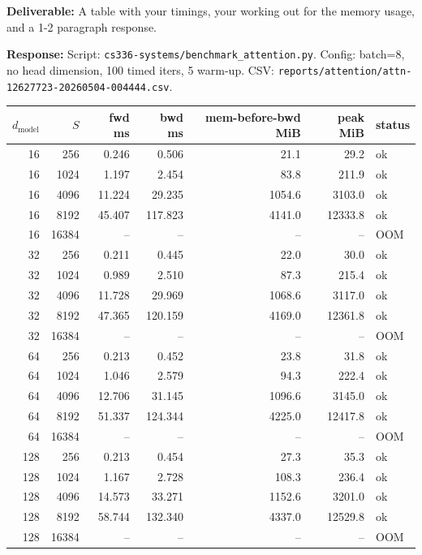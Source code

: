 \documentclass[11pt]{article}
\begin{document}
\textbf{Deliverable:} A table with your timings, your working out for the memory usage, and a 1-2 paragraph response.

\vspace{0.25cm}
\textbf{Response:}
Script: \texttt{cs336-systems/benchmark\_attention.py}. Config: batch=8, no head dimension, 100 timed iters, 5 warm-up. CSV: \verb|reports/attention/attn-12627723-20260504-004444.csv|.

\begin{table}[H]
\centering\small
\begin{tabular}{rrrrrrl}
\toprule
$d_\text{model}$ & $S$ & fwd ms & bwd ms & mem-before-bwd MiB & peak MiB & status \\
\midrule
16  & 256   & 0.246  & 0.506   & 21.1   & 29.2    & ok \\
16  & 1024  & 1.197  & 2.454   & 83.8   & 211.9   & ok \\
16  & 4096  & 11.224 & 29.235  & 1054.6 & 3103.0  & ok \\
16  & 8192  & 45.407 & 117.823 & 4141.0 & 12333.8 & ok \\
16  & 16384 & --     & --      & --     & --      & OOM \\
32  & 256   & 0.211  & 0.445   & 22.0   & 30.0    & ok \\
32  & 1024  & 0.989  & 2.510   & 87.3   & 215.4   & ok \\
32  & 4096  & 11.728 & 29.969  & 1068.6 & 3117.0  & ok \\
32  & 8192  & 47.365 & 120.159 & 4169.0 & 12361.8 & ok \\
32  & 16384 & --     & --      & --     & --      & OOM \\
64  & 256   & 0.213  & 0.452   & 23.8   & 31.8    & ok \\
64  & 1024  & 1.046  & 2.579   & 94.3   & 222.4   & ok \\
64  & 4096  & 12.706 & 31.145  & 1096.6 & 3145.0  & ok \\
64  & 8192  & 51.337 & 124.344 & 4225.0 & 12417.8 & ok \\
64  & 16384 & --     & --      & --     & --      & OOM \\
128 & 256   & 0.213  & 0.454   & 27.3   & 35.3    & ok \\
128 & 1024  & 1.167  & 2.728   & 108.3  & 236.4   & ok \\
128 & 4096  & 14.573 & 33.271  & 1152.6 & 3201.0  & ok \\
128 & 8192  & 58.744 & 132.340 & 4337.0 & 12529.8 & ok \\
128 & 16384 & --     & --      & --     & --      & OOM \\
\bottomrule
\end{tabular}
\end{table}
\end{document}
